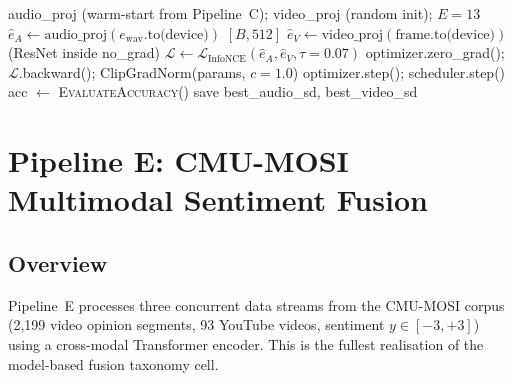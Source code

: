 \documentclass[12pt,a4paper]{article}
\theoremstyle{definition}
\theoremstyle{plain}
\theoremstyle{remark}
\begin{document}
\begin{algorithm}[H]
\caption{Stage 1: Cross-Modal InfoNCE Training (Pipeline D)}
\label{alg:stage1_d}
\begin{algorithmic}[1]
\Require audio\_proj (warm-start from Pipeline~C); video\_proj (random init); $E = 13$
    \State $\hat{e}_A \gets \text{audio\_proj}(e_{\text{wav}}.\text{to(device)})$ \quad $[B,512]$
    \State $\hat{e}_V \gets \text{video\_proj}(\text{frame}.\text{to(device)})$ \quad (ResNet inside no\_grad)
    \State $\mathcal{L} \gets \mathcal{L}_{\text{InfoNCE}}(\hat{e}_A, \hat{e}_V, \tau{=}0.07)$
    \State optimizer.zero\_grad(); $\mathcal{L}$.backward(); ClipGradNorm(params, $c = 1.0$)
    \State optimizer.step(); scheduler.step()
  \EndFor
  \State acc $\gets$ \textsc{EvaluateAccuracy}()
   save best\_audio\_sd, best\_video\_sd \EndIf
\EndFor
\end{algorithmic}
\end{algorithm}

\newpage
\section{Pipeline E: CMU-MOSI Multimodal Sentiment Fusion}
\label{sec:pipelineE}

\subsection{Overview}

Pipeline~E processes three concurrent data streams from the CMU-MOSI corpus (2,199 video opinion segments, 93 YouTube videos, sentiment $y \in [-3, +3]$) using a cross-modal Transformer encoder. This is the fullest realisation of the model-based fusion taxonomy cell.
\end{document}
